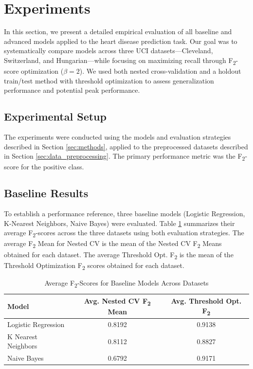\documentclass{article}
\begin{document}
\section{Experiments} %
\label{sec:experiments}

In this section, we present a detailed empirical evaluation of all baseline and advanced models applied to the heart disease prediction task. Our goal was to systematically compare models across three UCI datasets—Cleveland, Switzerland, and Hungarian—while focusing on maximizing recall through F\textsubscript{2}-score optimization ($\beta=2$). We used both nested cross-validation and a holdout train/test method with threshold optimization to assess generalization performance and potential peak performance.

\subsection{Experimental Setup}
The experiments were conducted using the models and evaluation strategies described in Section \ref{sec:methods}, applied to the preprocessed datasets described in Section \ref{sec:data_preprocessing}. The primary performance metric was the F\textsubscript{2}-score for the positive class.

\subsection{Baseline Results}
\label{sec:baseline_results}

To establish a performance reference, three baseline models (Logistic Regression, K-Nearest Neighbors, Naive Bayes) were evaluated. Table \ref{tab:baseline_perf} summarizes their average F\textsubscript{2}-scores across the three datasets using both evaluation strategies. The average F\textsubscript{2} Mean for Nested CV is the mean of the Nested CV F\textsubscript{2} Means obtained for each dataset. The average Threshold Opt. F\textsubscript{2} is the mean of the Threshold Optimization F\textsubscript{2} scores obtained for each dataset.

\begin{table}[htbp]
\centering
\caption{Average F\textsubscript{2}-Scores for Baseline Models Across Datasets}
\label{tab:baseline_perf}
\begin{tabular}{lcc}
\toprule
Model                 & Avg. Nested CV F\textsubscript{2} Mean & Avg. Threshold Opt. F\textsubscript{2} \\
\midrule
Logistic Regression   & 0.8192 & 0.9138    \\
K Nearest Neighbors   & 0.8112 & 0.8827    \\
Naive Bayes           & 0.6792 & 0.9171    \\
\bottomrule
\end{tabular}
\end{table}
\end{document}
